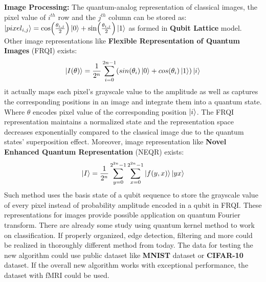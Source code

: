 \documentclass{article}
\begin{document}
\textbf{Image Processing:} The quantum-analog representation of classical images, the pixel value 
of $i^{th}$ row and the $j^{th}$ column can be stored as:
$\ket{pixel_{i,j}} = \cos(\frac{\theta_{i,j}}{2}) \ket{0} + 
\sin (\frac{\theta_{i,j}}{2}) \ket{1}$ as formed in \textbf{Qubit Lattice} model.
Other image representations like \textbf{Flexible Representation of 
Quantum Images} (FRQI) exists: 
\begin{equation}
  \ket{I(\theta)} = \frac{1}{2^n} \sum_{i=0}^{2n-1} (sin(\theta_i) \ket{0} + cos(\theta_i)\ket{1}) \ket{i}
\end{equation}
it actually maps each pixel's grayscale value to the amplitude as well as 
captures the corresponding positions in an image and integrate them into 
a quantum state. Where $\theta$ encodes pixel value of the corresponding 
position $\ket{i}$. The FRQI representation maintains a normalized state 
and the representation space decreases exponentially compared to the 
classical image due to the quantum states' superposition effect. 
Moreover, image representation like \textbf{Novel Enhanced Quantum Representation} (NEQR) exists:
\begin{equation}
  \ket{I} = \frac{1}{2^n} \sum^{2^{2n} -1 }_{y=0} \sum^{2^{2n} -1 }_{x=0} \ket{f(y,x)} \ket{y x}
\end{equation}
Such method uses the basis state of a qubit sequence to 
store the grayscale value of every pixel instead of 
probability amplitude encoded in a qubit in FRQI. 
These representations for images provide possible application on 
quantum Fourier transform. There are already some study using quantum kernel 
method to work on classification. If properly organized, edge detection, filtering 
and more could be realized in thoroughly different method from today. The 
data for testing the new algorithm could use public dataset like 
\textbf{MNIST} dataset or \textbf{CIFAR-10} dataset. If the 
overall new algorithm works with exceptional performance, the 
dataset with fMRI could be used. 
\end{document}
